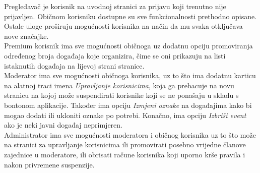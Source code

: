 		\eject
	
		\indent Pregledavač je korisnik na uvodnoj stranici za prijavu koji trenutno nije prijavljen. Običnom korisniku dostupne su sve funkcionalnosti prethodno opisane. Ostale uloge proširuju mogućnosti korisnika na način da mu svaka otključava nove značajke. \\
		
		\indent Premium korisnik ima sve mogućnosti običnoga uz dodatnu opciju promoviranja određenog broja događaja koje organizira, čime se oni prikazuju na listi istaknutih događaja na lijevoj strani stranice. \\
		
		\indent Moderator ima sve mogućnosti običnoga korisnika, uz to što ima dodatnu karticu na alatnoj traci imena \textit{Upravljanje korisnicima}, koja ga prebacuje na novu stranicu na kojoj može suspendirati korisnike koji se ne ponašaju u skladu s bontonom aplikacije. Također ima opciju \textit{Izmjeni oznake} na događajima kako bi mogao dodati ili ukloniti oznake po potrebi. Konačno, ima opciju \textit{Izbriši event} ako je neki javni događaj neprimjeren. \\
		
		\indent Administrator ima sve mogućnosti moderatora i običnog korisnika uz to što može na stranici za upravljanje korisnicima ili promovirati posebno vrijedne članove zajednice u moderatore, ili obrisati račune korisnika koji uporno krše pravila i nakon privremene suspenzije.
		
		\eject
		
	